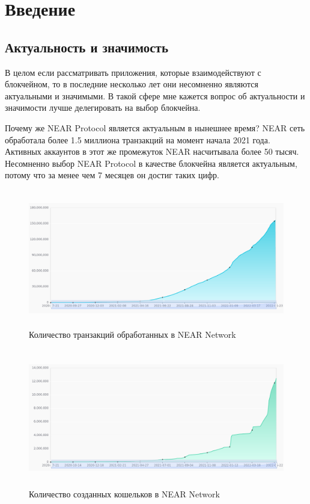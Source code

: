 \section{Введение}
\subsection{Актуальность и значимость}

В целом если рассматривать приложения, которые взаимодействуют с блокчейном, то в последние несколько лет они несомненно являются актуальными и значимыми\cite{DBLP:journals/corr/abs-1712-04649}. В такой сфере мне кажется вопрос об актуальности и значимости лучше делегировать на выбор блокчейна.

Почему же NEAR Protocol является актуальным в нынешнее время? NEAR сеть обработала более 1.5 миллиона транзакций на момент начала 2021 года. Активных аккаунтов в этот же промежуток NEAR насчитывала более 50 тысяч. Несомненно выбор NEAR Protocol в качестве блокчейна является актуальным, потому что за менее чем 7 месяцев он достиг таких цифр.

\begin{figure}[H]
	\centering
	\includegraphics[height=60mm]{fig/near_1.png}
	\caption{Количество транзакций обработанных в NEAR Network}
\end{figure}


\begin{figure}[H]
	\centering
	\includegraphics[height=60mm]{fig/near_2.png}
	\caption{Количество созданных кошельков в NEAR Network}
\end{figure}


